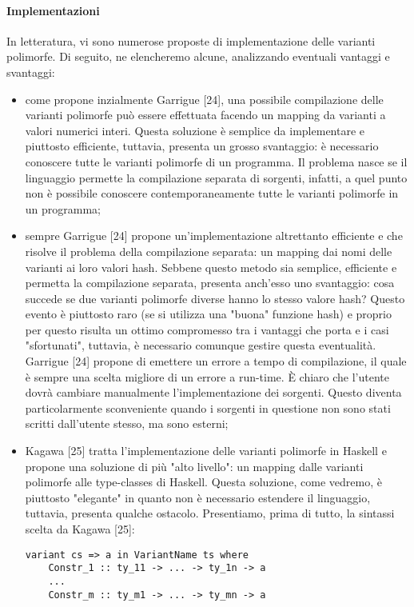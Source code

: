 \documentclass[10pt,a4paper]{article}
\begin{document}
\paragraph{Implementazioni}
In letteratura, vi sono numerose proposte di implementazione delle varianti polimorfe. Di seguito, ne elencheremo alcune,
analizzando eventuali vantaggi e svantaggi:
\begin{itemize}
    \item come propone inzialmente Garrigue [24], una possibile compilazione delle varianti polimorfe può essere effettuata
    facendo un mapping da varianti a valori numerici interi. Questa soluzione è semplice da implementare e piuttosto
    efficiente, tuttavia, presenta un grosso svantaggio: è necessario conoscere tutte le varianti polimorfe di un programma.
    Il problema nasce se il linguaggio permette la compilazione separata di sorgenti, infatti, a quel punto non è possibile
    conoscere contemporaneamente tutte le varianti polimorfe in un programma;
    \item sempre Garrigue [24] propone un'implementazione altrettanto efficiente e che risolve il problema della
    compilazione separata: un mapping dai nomi delle varianti ai loro valori hash. Sebbene questo metodo sia semplice,
    efficiente e permetta la compilazione separata, presenta anch'esso uno svantaggio: cosa succede se due varianti
    polimorfe diverse hanno lo stesso valore hash? Questo evento è piuttosto raro (se si utilizza una "buona" funzione hash)
    e proprio per questo risulta un ottimo compromesso tra i vantaggi che porta e i casi "sfortunati", tuttavia, è
    necessario comunque gestire questa eventualità. Garrigue [24] propone di emettere un errore a tempo di compilazione,
    il quale è sempre una scelta migliore di un errore a run-time. \`E chiaro che l'utente dovrà cambiare manualmente
    l'implementazione dei sorgenti. Questo diventa particolarmente sconveniente quando i sorgenti in questione non sono
    stati scritti dall'utente stesso, ma sono esterni;
    \item Kagawa [25] tratta l'implementazione delle varianti polimorfe in Haskell e propone una soluzione di più
    "alto livello": un mapping dalle varianti polimorfe alle type-classes di Haskell. Questa soluzione, come vedremo, è
    piuttosto "elegante" in quanto non è necessario estendere il linguaggio, tuttavia, presenta qualche ostacolo.
    Presentiamo, prima di tutto, la sintassi scelta da Kagawa [25]:
\begin{lstlisting}
variant cs => a in VariantName ts where
    Constr_1 :: ty_11 -> ... -> ty_1n -> a
    ...
    Constr_m :: ty_m1 -> ... -> ty_mn -> a
\end{lstlisting}
\end{itemize}
\end{document}
